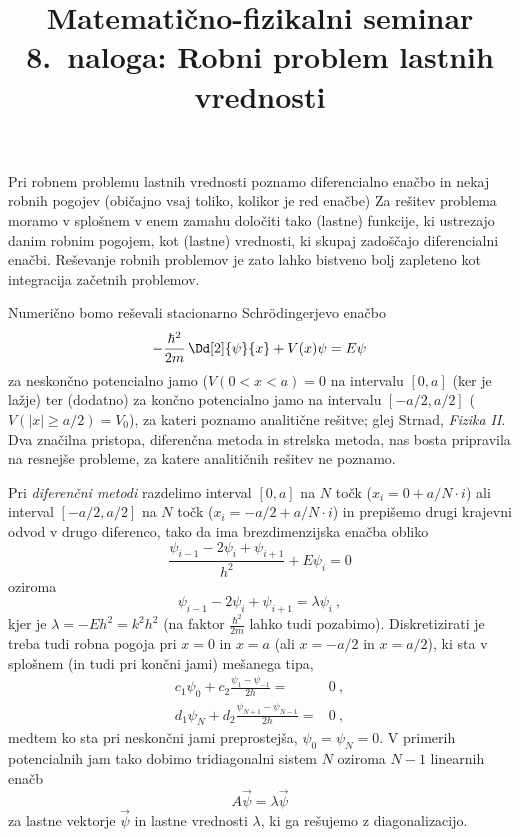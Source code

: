 \documentclass[slovene,11pt,a4paper]{article}
\title{
\sc\large Matematično-fizikalni seminar \thisyear\\
\bigskip
\bf\Large 8.~naloga: Robni problem lastnih vrednosti
}
\author{}
\date{}
\begin{document}
\maketitle
\vspace{-1cm}

Pri robnem problemu lastnih vrednosti poznamo diferencialno enačbo
in nekaj robnih pogojev (običajno vsaj toliko, kolikor je red enačbe)
Za rešitev problema moramo v splošnem v enem zamahu določiti
tako (lastne) funkcije, ki ustrezajo danim robnim pogojem,
kot (lastne) vrednosti, ki skupaj zadoščajo diferencialni enačbi.
Reševanje robnih problemov je zato lahko bistveno bolj zapleteno
kot integracija začetnih problemov.


Numerično bomo reševali stacionarno Schr\"odingerjevo enačbo
\begin{equation*}
-\frac{\hbar^2}{2m}\,\Dd[2]{\psi}{x} + V(x)\psi = E\psi
\end{equation*}
za neskončno potencialno jamo ($V(0 < x < a)=0$ na intervalu $[0,a]$ (ker je lažje)
 ter (dodatno) za končno potencialno jamo na intervalu $[-a/2,a/2]$
($V(|x|\ge a/2)=V_0$), za kateri poznamo analitične rešitve;
glej Strnad, {\sl Fizika II\/}.  Dva značilna pristopa, diferenčna
metoda in strelska metoda, nas bosta pripravila na resnejše probleme,
za katere analitičnih rešitev ne poznamo.

Pri {\sl diferenčni metodi\/} razdelimo interval $[0,a]$ na $N$ točk ($x_i = 0 + a/N\cdot i$) ali interval
$[-a/2,a/2]$ na $N$ točk ($x_i = -a/2 + a/N\cdot i$) in prepišemo drugi
krajevni odvod v drugo diferenco, tako da ima brezdimenzijska enačba obliko
\begin{equation*}
\frac{\psi_{i-1} - 2\psi_i + \psi_{i+1}}{h^2} + E\psi_i = 0
\end{equation*}
oziroma
\begin{equation*}
\psi_{i-1} - 2 \psi_i + \psi_{i+1} = \lambda\psi_i \>,
\end{equation*}
kjer je $\lambda=-Eh^2=k^2h^2$ (na faktor $\tfrac{\hbar^2}{2m}$ lahko tudi pozabimo). Diskretizirati je treba tudi robna
pogoja pri  $x=0$ in $x=a$ (ali $x=-a/2$ in $x=a/2$), ki sta v splošnem (in tudi
pri končni jami) mešanega tipa,
\begin{align*}
c_1 \psi_0 + c_2 \frac{\psi_1 - \psi_{-1}}{2h} =& 0 \>, \\
d_1 \psi_N + d_2 \frac{\psi_{N+1} - \psi_{N-1}}{2h} =& 0 \>,
\end{align*}
medtem ko sta pri neskončni jami preprostejša, $\psi_0=\psi_N=0$.
V primerih potencialnih jam tako dobimo tridiagonalni sistem $N$
oziroma $N-1$ linearnih enačb
\begin{equation*}
A \vec{\psi} = \lambda \vec{\psi}
\end{equation*}
za lastne vektorje $\vec{\psi}$ in lastne vrednosti $\lambda$,
ki ga rešujemo z diagonalizacijo.
\end{document}

